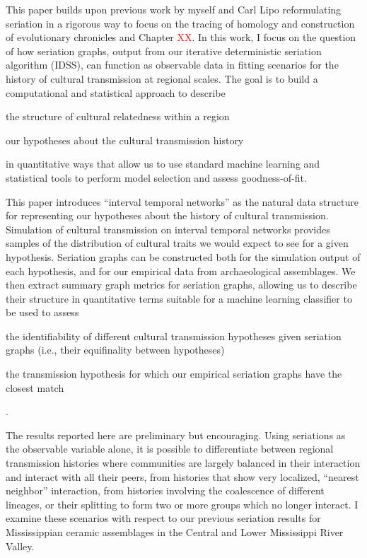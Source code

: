     This paper builds upon previous work by myself and Carl Lipo reformulating seriation in a rigorous way to focus on the tracing of homology and construction of evolutionary chronicles  \citep{Lipo1997,Lipo2001,Lipo2015,Madsen2008} and Chapter \textcolor{red}{XX}. In this work, I focus on the question of how seriation graphs, output from our iterative deterministic seriation algorithm (IDSS), can function as observable data in fitting scenarios for the history of cultural transmission at regional scales.  The goal is to build a computational and statistical approach to describe \begin{dissparalist}
    \item the structure of cultural relatedness within a region  
    \item our hypotheses about the cultural transmission history 
    \end{dissparalist} in quantitative ways that allow us to use standard machine learning and statistical tools to perform model selection and assess goodness-of-fit.  
    
    This paper introduces ``interval temporal networks'' as the natural data structure for representing our hypotheses about the history of cultural transmission.  Simulation of cultural transmission on interval temporal networks provides samples of the distribution of cultural traits we would expect to see for a given hypothesis.  Seriation graphs can be constructed both for the simulation output of each hypothesis, and for our empirical data from archaeological assemblages.  We then extract summary graph metrics for seriation graphs, allowing us to describe their structure in quantitative terms suitable for a machine learning classifier to be used to assess \begin{dissparalist}
    \item the identifiability of different cultural transmission hypotheses given seriation graphs (i.e., their equifinality between hypotheses)
    \item the transmission hypothesis for which our empirical seriation graphs have the closest match
    \end{dissparalist}.
    
    The results reported here are preliminary but encouraging.  Using seriations as the observable variable alone, it is possible to differentiate between regional transmission histories where communities are largely balanced in their interaction and interact with all their peers, from histories that show very localized, ``nearest neighbor'' interaction, from histories involving the coalescence of different lineages, or their splitting to form two or more groups which no longer interact.  I examine these scenarios with respect to our previous seriation results for Mississippian ceramic assemblages in the Central and Lower Mississippi River Valley.   
    
